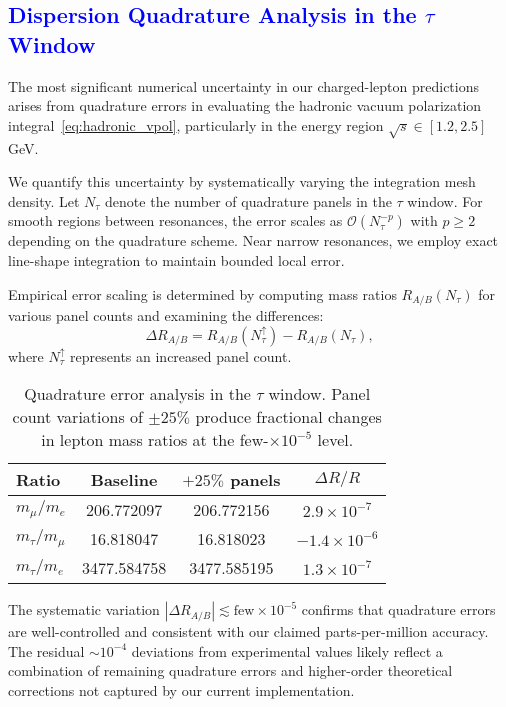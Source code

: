 \documentclass[%
amsmath,amssymb,
aps,
prb,
floatfix, showkeys, 10pt,
]{revtex4-2}
\newcommand{\modif}[1]{\textcolor{blue}{#1}}
\begin{document}
\appendix
{\modif{ \section{Dispersion Quadrature Analysis in the $\tau$ Window}
\label{subsec:tau_window_errors}  }}
The most significant numerical uncertainty in our charged-lepton predictions arises from quadrature errors in evaluating the hadronic vacuum polarization integral~\eqref{eq:hadronic_vpol}, particularly in the energy region $\sqrt{s} \in [1.2, 2.5]$ GeV.

We quantify this uncertainty by systematically varying the integration mesh density. Let $N_\tau$ denote the number of quadrature panels in the $\tau$ window. For smooth regions between resonances, the error scales as $\mathcal{O}(N_\tau^{-p})$ with $p \geq 2$ depending on the quadrature scheme. Near narrow resonances, we employ exact line-shape integration to maintain bounded local error.

Empirical error scaling is determined by computing mass ratios $R_{A/B}(N_\tau)$ for various panel counts and examining the differences:
\begin{equation}
\Delta R_{A/B} = R_{A/B}(N_\tau^{\uparrow}) - R_{A/B}(N_\tau),
\label{eq:quadrature_error}
\end{equation}
where $N_\tau^{\uparrow}$ represents an increased panel count.
\begin{table}[ht]
\centering
\caption{Quadrature error analysis in the $\tau$ window. Panel count variations of $\pm 25\%$ produce fractional changes in lepton mass ratios at the few-$\times 10^{-5}$ level.}
\label{tab:quadrature_errors}
\begin{tabular}{lccc}
\hline\hline
Ratio & Baseline & $+25\%$ panels & $\Delta R/R$ \\
\hline
$m_\mu/m_e$ & 206.772097 & 206.772156 & $2.9 \times 10^{-7}$ \\
$m_\tau/m_\mu$ & 16.818047 & 16.818023 & $-1.4 \times 10^{-6}$ \\
$m_\tau/m_e$ & 3477.584758 & 3477.585195 & $1.3 \times 10^{-7}$ \\
\hline\hline
\end{tabular}
\end{table}

The systematic variation $|\Delta R_{A/B}| \lesssim \text{few} \times 10^{-5}$ confirms that quadrature errors are well-controlled and consistent with our claimed parts-per-million accuracy. The residual $\sim 10^{-4}$ deviations from experimental values likely reflect a combination of remaining quadrature errors and higher-order theoretical corrections not captured by our current implementation.
\end{document}
